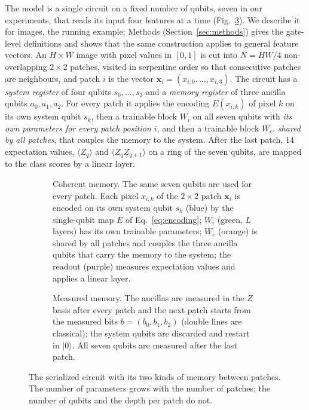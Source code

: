 \documentclass[11pt]{article}
\begin{document}
The model is a single circuit on a fixed number of qubits, seven in our experiments, that reads its input four features at a time (Fig.~\ref{fig:circuit}). We describe it for images, the running example; Methods (Section~\ref{sec:methods}) gives the gate-level definitions and shows that the same construction applies to general feature vectors. An $H\times W$ image with pixel values in $[0,1]$ is cut into $N=HW/4$ non-overlapping $2\times2$ patches, visited in serpentine order so that consecutive patches are neighbours, and patch $i$ is the vector $\mathbf{x}_i=(x_{i,0},\dots,x_{i,3})$. The circuit has a \emph{system register} of four qubits $s_0,\dots,s_3$ and a \emph{memory register} of three ancilla qubits $a_0,a_1,a_2$. For every patch it applies the encoding $E(x_{i,k})$ of pixel $k$ on its own system qubit $s_k$, then a trainable block $W_i$ on all seven qubits with \emph{its own parameters for every patch position $i$}, and then a trainable block $W_c$, \emph{shared by all patches}, that couples the memory to the system. After the last patch, 14 expectation values, $\langle Z_q\rangle$ and $\langle Z_qZ_{q+1}\rangle$ on a ring of the seven qubits, are mapped to the class scores by a linear layer.

\begin{figure}[t]
  \centering
  \begin{subfigure}{\textwidth}
    \centering
    \resizebox{0.86\textwidth}{!}{}
    \caption{Coherent memory. The same seven qubits are used for every patch. Each pixel $x_{i,k}$ of the $2\times2$ patch $\mathbf{x}_i$ is encoded on its own system qubit $s_k$ (blue) by the single-qubit map $E$ of Eq.~\eqref{eq:encoding}; $W_i$ (green, $L$ layers) has its own trainable parameters; $W_c$ (orange) is shared by all patches and couples the three ancilla qubits that carry the memory to the system; the readout (purple) measures expectation values and applies a linear layer.}
    \label{fig:circuit-coherent}
  \end{subfigure}

  \bigskip
  \begin{subfigure}{\textwidth}
    \centering
    \resizebox{\textwidth}{!}{}
    \caption{Measured memory. The ancillas are measured in the $Z$ basis after every patch and the next patch starts from the measured bits $b=(b_0,b_1,b_2)$ (double lines are classical); the system qubits are discarded and restart in $\lvert0\rangle$. All seven qubits are measured after the last patch.}
    \label{fig:circuit-measured}
  \end{subfigure}
  \caption{The serialized circuit with its two kinds of memory between patches. The number of parameters grows with the number of patches; the number of qubits and the depth per patch do not.}
  \label{fig:circuit}
\end{figure}
\end{document}
